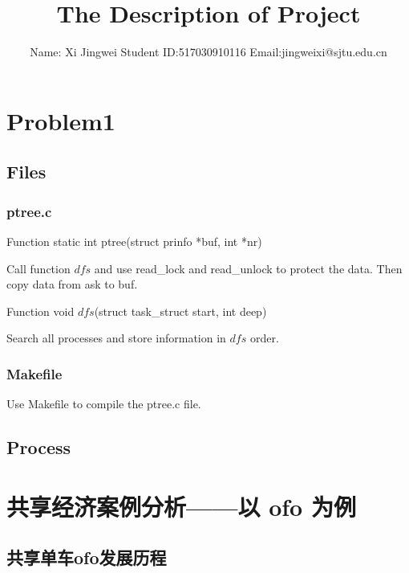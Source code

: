 \documentclass[a4paper,oneside,12pt]{article}
\title{\huge{The Description of Project}}
\author{Name: Xi Jingwei  \quad Student ID:517030910116 \quad   Email:jingweixi@sjtu.edu.cn}
\date{}  %
\begin{document}
\maketitle
\setlength{\oddsidemargin}{0.5cm}
\setlength{\evensidemargin}{\oddsidemargin}
\setlength{\textwidth}{15cm}
\vspace{-.8cm}


\setlength{\oddsidemargin}{-.5cm}  %
\setlength{\evensidemargin}{\oddsidemargin}
\setlength{\textwidth}{17.00cm}

\section{Problem1}
\subsection{Files}
\subsubsection{ptree.c}
Function static int ptree(struct prinfo *buf, int *nr)

Call function $dfs$ and use read\_lock and read\_unlock to protect the data. Then copy data from ask to buf.

Function void $dfs$(struct task\_struct start, int deep)

Search all processes and store information in $dfs$ order.

\subsubsection{Makefile}

Use Makefile to compile the ptree.c file.

\subsection{Process}


\section{共享经济案例分析——以 ofo 为例}
\subsection{共享单车ofo发展历程}
\end{document}
